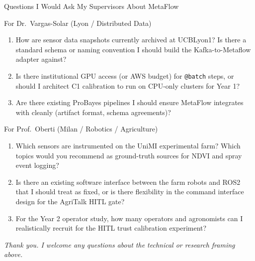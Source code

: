 \documentclass[10pt,aspectratio=169]{beamer}
\begin{document}
\begin{frame}{Questions I Would Ask My Supervisors About MetaFlow}

\begin{block}{For Dr.\ Vargas-Solar (Lyon / Distributed Data)}
\begin{enumerate}\small
  \item How are sensor data snapshots currently archived at UCBLyon1? Is there a standard schema or naming convention I should build the Kafka-to-Metaflow adapter against?
  \item Is there institutional GPU access (or AWS budget) for \texttt{@batch} steps, or should I architect C1 calibration to run on CPU-only clusters for Year 1?
  \item Are there existing ProBayes pipelines I should ensure MetaFlow integrates with cleanly (artifact format, schema agreements)?
\end{enumerate}
\end{block}

\begin{block}{For Prof.\ Oberti (Milan / Robotics / Agriculture)}
\begin{enumerate}\small
  \item Which sensors are instrumented on the UniMI experimental farm? Which topics would you recommend as ground-truth sources for NDVI and spray event logging?
  \item Is there an existing software interface between the farm robots and ROS2 that I should treat as fixed, or is there flexibility in the command interface design for the AgriTalk HITL gate?
  \item For the Year 2 operator study, how many operators and agronomists can I realistically recruit for the HITL trust calibration experiment?
\end{enumerate}
\end{block}

\vspace{0.2cm}
\begin{center}
\small\textit{Thank you. I welcome any questions about the technical or research framing above.}
\end{center}

\end{frame}
\end{document}
